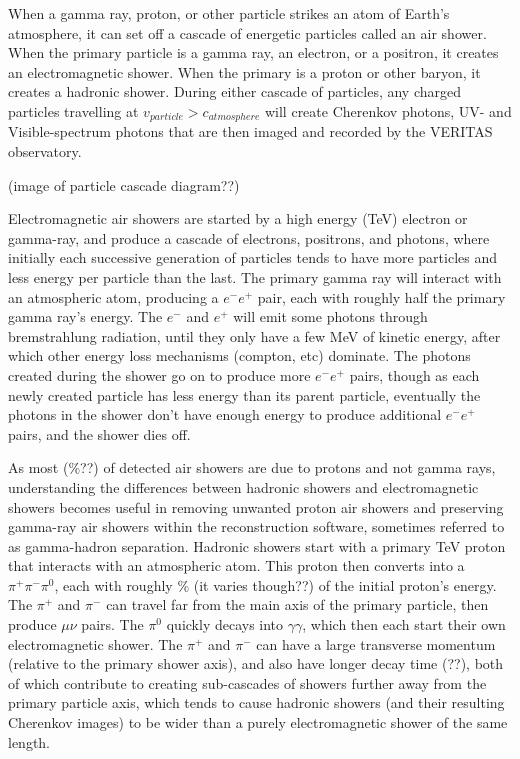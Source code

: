 When a gamma ray, proton, or other particle strikes an atom of Earth's atmosphere, it can set off a cascade of energetic particles called an air shower.
When the primary particle is a gamma ray, an electron, or a positron, it creates an electromagnetic shower.
When the primary is a proton or other baryon, it creates a hadronic shower.
During either cascade of particles, any charged particles travelling at $v_{particle} > c_{atmosphere}$ will create Cherenkov photons, UV- and Visible-spectrum photons that are then imaged and recorded by the VERITAS observatory.

(image of particle cascade diagram??)

Electromagnetic air showers are started by a high energy (\nicetilde TeV) electron or gamma-ray, and produce a cascade of electrons, positrons, and photons, where initially each successive generation of particles tends to have more particles and less energy per particle than the last.
The primary gamma ray will interact with an atmospheric atom, producing a $e^{-}e^{+}$ pair, each with roughly half the primary gamma ray's energy.
The $e^{-}$ and $e^{+}$ will emit some photons through bremstrahlung radiation, until they only have a few MeV of kinetic energy, after which other energy loss mechanisms (compton, etc) dominate.
The photons created during the shower go on to produce more $e^{-}e^{+}$ pairs, though as each newly created particle has less energy than its parent particle, eventually the photons in the shower don't have enough energy to produce additional $e^{-}e^{+}$ pairs, and the shower dies off.

As most (\%??) of detected air showers are due to protons and not gamma rays, understanding the differences between hadronic showers and electromagnetic showers becomes useful in removing unwanted proton air showers and preserving gamma-ray air showers within the reconstruction software, sometimes referred to as gamma-hadron separation.
Hadronic showers start with a primary \nicetilde TeV proton that interacts with an atmospheric atom.
This proton then converts into a $\pi^{+}\pi^{-}\pi^{0}$, each with roughly \% (it varies though??) of the initial proton's energy.
The $\pi^{+}$ and $\pi^{-}$ can travel far from the main axis of the primary particle, then produce $\mu\nu$ pairs.
The $\pi^{0}$ quickly decays into $\gamma\gamma$, which then each start their own electromagnetic shower.
The $\pi^{+}$ and $\pi^{-}$ can have a large transverse momentum (relative to the primary shower axis), and also have longer decay time (??), both of which contribute to creating sub-cascades of showers further away from the primary particle axis, which tends to cause hadronic showers (and their resulting Cherenkov images) to be wider than a purely electromagnetic shower of the same length. 

